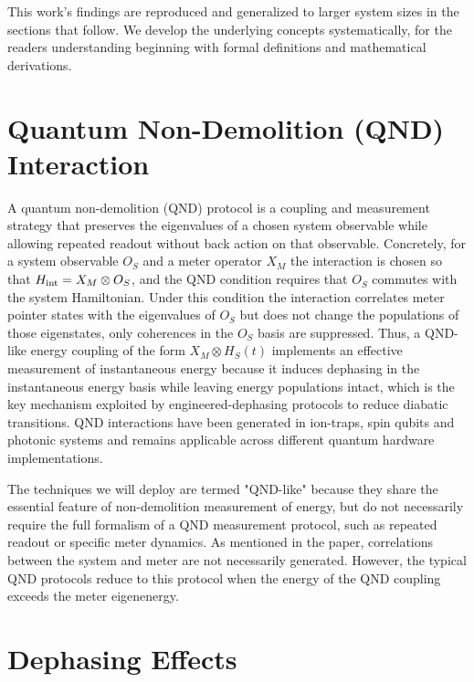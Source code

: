 \qquad This work's findings are reproduced and generalized to larger system sizes in the sections that follow. We develop the underlying concepts systematically, for the readers understanding beginning with formal definitions and mathematical derivations.

\section{Quantum Non-Demolition (QND) Interaction}

\qquad A quantum non-demolition (QND) protocol is a coupling and measurement strategy that preserves the eigenvalues of a chosen system observable while allowing repeated readout without back action on that observable. Concretely, for a system observable $O_S$ and a meter operator $X_M$ the interaction is chosen so that $H_{\rm int}=X_M\otimes O_S$, and the QND condition requires that $O_S$ commutes with the system Hamiltonian. Under this condition the interaction correlates meter pointer states with the eigenvalues of $O_S$ but does not change the populations of those eigenstates, only coherences in the $O_S$ basis are suppressed.\cite{QNDTheory2015} Thus, a QND-like energy coupling of the form $X_M\otimes H_S(t)$ implements an effective measurement of instantaneous energy because it induces dephasing in the instantaneous energy basis while leaving energy populations intact, which is the key mechanism exploited by engineered-dephasing protocols to reduce diabatic transitions. QND interactions have been generated in ion-traps\cite{IonQNDIsing2019}, spin qubits\cite{Nakajima2019QND} and photonic systems\cite{QNDOptics1998} and remains applicable across different quantum hardware implementations.

\qquad The techniques we will deploy are termed "QND-like" because they share the essential feature of non-demolition measurement of energy, but do not necessarily require the full formalism of a QND measurement protocol, such as repeated readout or specific meter dynamics. As mentioned in the paper, correlations between the system and meter are not necessarily generated.\cite{DephasingPaper} However, the typical QND protocols reduce to this protocol when the energy of the QND coupling exceeds the meter eigenenergy.


\section{Dephasing Effects}

